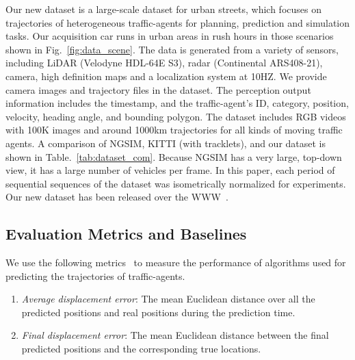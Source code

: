 \documentclass[letterpaper]{article} \usepackage{aaai19}  \usepackage{times}  \usepackage{helvet}  \usepackage{courier}  \usepackage{url}  \usepackage{graphicx}  \usepackage{amsmath}
\begin{document}
Our new dataset is a large-scale dataset for urban streets, which focuses on trajectories of heterogeneous traffic-agents for planning, prediction and simulation tasks. Our acquisition car runs in urban areas in rush hours in those scenarios shown in Fig.~\ref{fig:data_scene}. The data is generated from a variety of sensors, including LiDAR (Velodyne HDL-64E S3), radar (Continental ARS408-21), camera, high definition maps and a localization system at 10HZ. We provide camera images and trajectory files in the dataset. The perception output information includes the timestamp, and the traffic-agent's ID, category, position, velocity, heading angle, and bounding polygon. The  dataset  includes RGB videos with 100K  images and around 1000km trajectories for all kinds of moving traffic agents. A comparison of NGSIM, KITTI (with tracklets), and our dataset is shown in Table.~\ref{tab:dataset_com}. Because NGSIM has a very large, top-down view, it has a large number of vehicles per frame. In this paper, each period of sequential sequences of the dataset was isometrically normalized for experiments. 
Our new dataset has been released over the WWW~\cite{apolloscapeTrajectory}.



\subsection{Evaluation Metrics and Baselines}

We use the following metrics~\cite{pellegrini2009you,vemula2017social} to measure the performance of algorithms used for predicting the trajectories of traffic-agents. 

\begin{enumerate}[1.]
\item \textit{Average displacement error}: The mean Euclidean distance over all the predicted positions and real positions during the prediction time.
\item \textit{Final displacement error}: The mean Euclidean distance between the final predicted positions and the corresponding true locations. 
\end{enumerate}
\end{document}
